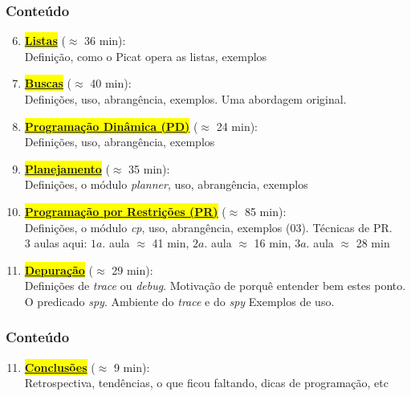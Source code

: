 			
\begin{frame}[fragile]
  \frametitle{Conteúdo}
  
  \begin{enumerate}

   \setcounter{enumi}{5}
    \item  \colorbox{yellow}{\textbf{\underline{Listas}}} ($\approx$ 36 min):\\
    Definição, como o Picat opera as listas, exemplos


    \pause
    \item  \colorbox{yellow}{\textbf{\underline{Buscas}}} ($\approx$ 40 min):\\
     Definições, uso, abrangência, exemplos. Uma abordagem
     original.

    \pause
    \item \colorbox{yellow}{\textbf{\underline{Programação Dinâmica (PD)}}} ($\approx$ 24 min):\\
    Definições, uso, abrangência, exemplos

    
    \pause
    \item \colorbox{yellow}{\textbf{\underline{Planejamento}}} ($\approx$ 35 min):\\
        Definições, o módulo \textit{planner}, uso, abrangência, exemplos

    \pause
		\item \colorbox{yellow}{\textbf{\underline{Programação por Restrições (PR)}}} ($\approx$ 85 min):\\
      Definições, o módulo \textit{cp}, uso, abrangência, exemplos (03).
      Técnicas de PR.\\
      3 aulas aqui: $1a.$ aula $\approx$ 41 min, $2a.$ aula $\approx$ 16 min,
      $3a.$ aula $\approx$ 28 min
     

    \pause
    \item \colorbox{yellow}{\textbf{\underline{Depuração}}} ($\approx$ 29 min):\\
        Definições de \textit{trace}  ou \textit{debug}. Motivação de porquê entender bem estes   ponto. O predicado \textit{spy}. Ambiente do \textit{trace} e do \textit{spy}
        Exemplos de uso.

\end{enumerate}

\end{frame}


			
\begin{frame}[fragile]
  \frametitle{Conteúdo}
  
  \begin{enumerate}

   \setcounter{enumi}{10}

		\item  \colorbox{yellow}{\textbf{\underline{Conclusões}}} ($\approx$ 9 min):\\
    Retrospectiva, tendências, o que ficou faltando, 
    dicas de programação, etc

    
\end{enumerate}

\end{frame}


